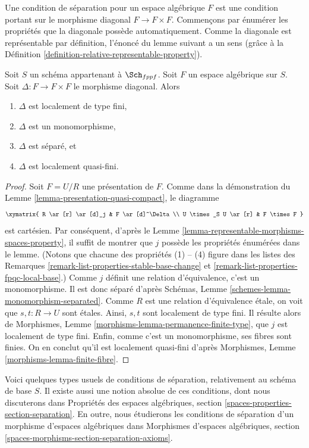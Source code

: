 \noindent
Une condition de séparation pour un espace algébrique $F$ est une condition
portant sur le morphisme diagonal $F \to F \times F$. Commençons par
énumérer les propriétés que la diagonale possède automatiquement.
Comme la diagonale est représentable par définition, l'énoncé du lemme suivant
a un sens (grâce à la
Définition \ref{definition-relative-representable-property}).

\begin{lemma}
\label{lemma-properties-diagonal}
Soit $S$ un schéma appartenant à $\Sch_{fppf}$.
Soit $F$ un espace algébrique sur $S$.
Soit $\Delta : F \to F \times F$ le morphisme diagonal.
Alors
\begin{enumerate}
\item $\Delta$ est localement de type fini,
\item $\Delta$ est un monomorphisme,
\item $\Delta$ est séparé, et
\item $\Delta$ est localement quasi-fini.
\end{enumerate}
\end{lemma}

\begin{proof}
Soit $F = U/R$ une présentation de $F$.
Comme dans la démonstration du Lemme \ref{lemma-presentation-quasi-compact}, le diagramme
$$
\xymatrix{
R \ar[r] \ar[d]_j & F \ar[d]^\Delta \\
U \times_S U \ar[r] & F \times F
}
$$
est cartésien. Par conséquent, d'après le
Lemme \ref{lemma-representable-morphisms-spaces-property},
il suffit de montrer que $j$ possède les propriétés énumérées dans le lemme.
(Notons que chacune des propriétés (1) -- (4) figure dans les listes
des Remarques \ref{remark-list-properties-stable-base-change}
et \ref{remark-list-properties-fpqc-local-base}.)
Comme $j$ définit une relation d'équivalence, c'est un monomorphisme.
Il est donc séparé d'après
Schémas, Lemme \ref{schemes-lemma-monomorphism-separated}.
Comme $R$ est une relation d'équivalence \'etale, on voit que
$s, t : R \to U$ sont \'etales. Ainsi, $s, t$ sont localement de
type fini. Il résulte alors de
Morphismes, Lemme \ref{morphisms-lemma-permanence-finite-type}, que
$j$ est localement de type fini. Enfin, comme c'est un monomorphisme,
ses fibres sont finies. On en conclut qu'il est localement quasi-fini d'après
Morphismes, Lemme \ref{morphisms-lemma-finite-fibre}.
\end{proof}

\noindent
Voici quelques types usuels de conditions de séparation, relativement au schéma
de base $S$. Il existe aussi une notion absolue de ces conditions, dont nous
discuterons dans
Propriétés des espaces algébriques, section \ref{spaces-properties-section-separation}.
En outre, nous étudierons les conditions de séparation d'un morphisme
d'espaces algébriques dans
Morphismes d'espaces algébriques, section \ref{spaces-morphisms-section-separation-axioms}.

